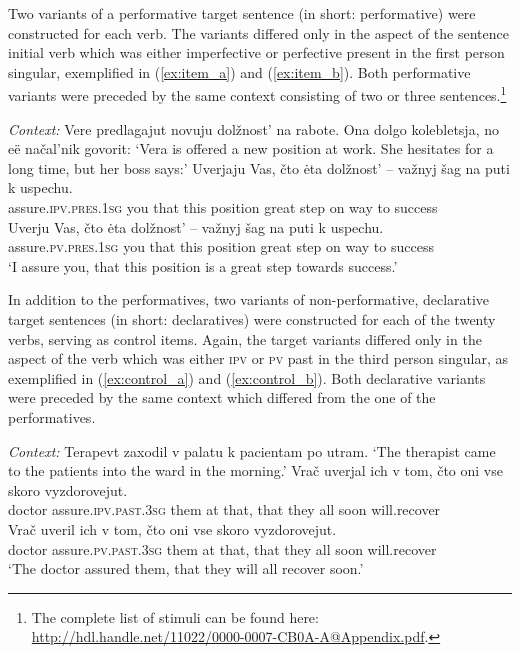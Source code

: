 \documentclass[output=paper,
colorlinks,
citecolor=brown,
newtxmath,
hidelinks
]{langscibook}
\begin{document}
Two variants of a performative target sentence (in short: performative) were constructed for each verb. The variants differed only in the aspect of the sentence initial verb which was either imperfective or perfective present in the first person singular, exemplified in (\ref{ex:item_a}) and (\ref{ex:item_b}). Both performative variants were preceded by the same context consisting of two or three sentences.\footnote{The complete list of stimuli can be found here: \url{http://hdl.handle.net/11022/0000-0007-CB0A-A@Appendix.pdf}.\label{fn:app}}

\ea\label{ex:item} \textit{Context:} Vere predlagajut novuju dolžnost' na rabote. Ona dolgo kolebletsja, no eë načal'nik govorit:
    \glt `Vera is offered a new position at work. She hesitates for a long time, but her boss says:'
	\ea\label{ex:item_a} 
		 \gll    Uverjaju Vas, čto ėta dolžnost' -- važnyj šag na puti k uspechu.\\
              assure\textsc{.ipv.pres.1sg} you that this position {} great step on way to success\\
	\ex\label{ex:item_b}
		 \gll    Uverju Vas, čto ėta dolžnost' -- važnyj šag na puti k uspechu.\\
              assure\textsc{.pv.pres.1sg} you that this position {} great step on way to success\\
              \z
		\glt ‘I assure you, that this position is a great step towards success.’     
\z

\noindent In addition to the performatives, two variants of non-performative, declarative target sentences (in short: declaratives) were constructed for each of the twenty verbs, serving as control items. Again, the target variants differed only in the aspect of the verb which was either \textsc{ipv} or \textsc{pv} past in the third person singular, as exemplified in (\ref{ex:control_a}) and (\ref{ex:control_b}). Both declarative variants were preceded by the same context which differed from the one of the performatives.

\ea\label{ex:control} \textit{Context:} Terapevt zaxodil v palatu k pacientam po utram.
    \glt ‘The therapist came to the patients into the ward in the morning.’
	\ea\label{ex:control_a} 
		 \gll    Vrač uverjal ich v tom, čto oni vse skoro vyzdorovejut.\\
              doctor assure\textsc{.ipv.past.3sg} them at that, that they all soon will.recover\\
	\ex\label{ex:control_b}
		 \gll    Vrač uveril ich v tom, čto oni vse skoro vyzdorovejut.\\
              doctor assure\textsc{.pv.past.3sg} them at that, that they all soon will.recover\\
              \z
		\glt ‘The doctor assured them, that they will all recover soon.’        
\z
\end{document}
